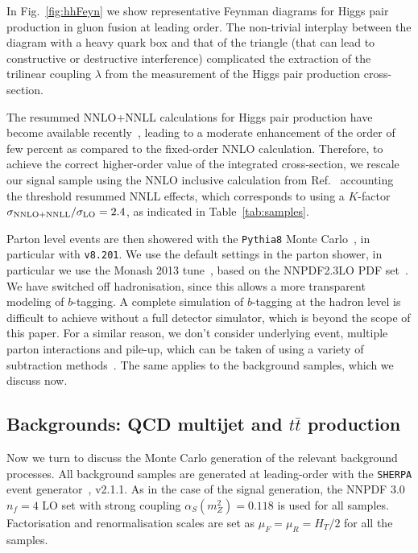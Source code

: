 In Fig.~\ref{fig:hhFeyn} we show representative Feynman diagrams
    for Higgs pair production in gluon fusion at
    leading order.
    The non-trivial interplay between the diagram with a heavy quark box
    and that of the triangle (that can lead to constructive or destructive interference)
    complicated the extraction of
    the trilinear coupling
    $\lambda$ from the measurement of the Higgs pair
    production cross-section.

The resummed NNLO+NNLL calculations for Higgs pair production have become available recently~\cite{deFlorian:2015moa},
leading to a moderate enhancement of the order of
few percent as compared to the fixed-order NNLO calculation.
%
Therefore, to achieve the correct higher-order value of the  integrated cross-section,
we rescale our signal sample using the
NNLO inclusive calculation from Ref.~\cite{deFlorian:2013jea} accounting the threshold resummed
NNLL effects, which corresponds to using a $K$-factor $\sigma_{\rm NNLO+NNLL}/\sigma_{\rm LO}=2.4$, as indicated
in Table~\ref{tab:samples}.


%
Parton level events are then showered with the {\tt Pythia8} Monte
Carlo~\cite{Sjostrand:2007gs,Sjostrand:2014zea}, in particular with {\tt v8.201}.
%
We use the default settings in the parton shower, in particular
we use the Monash 2013 tune~\cite{Skands:2014pea}, based on the NNPDF2.3LO PDF set~\cite{Ball:2012cx}.
%
We have switched off hadronisation, since this allows a more transparent modeling of
$b$-tagging.
%
A complete simulation of $b$-tagging at the hadron level is difficult to achieve without a full
detector simulator, which is beyond the scope of this paper.
%
For a similar reason, we don't consider underlying event, multiple parton interactions and
pile-up, which can be taken of using a variety of subtraction methods~\cite{Cacciari:2009dp,TheATLAScollaboration:2013pia}.
%
The same applies to the background samples, which we discuss now.

\subsection{Backgrounds: QCD multijet and $t\bar{t}$ production}

Now we turn to discuss the Monte Carlo generation of the relevant background processes.
%
All background samples are generated at leading-order
with the {\tt SHERPA} event generator~\cite{Gleisberg:2008ta}, v2.1.1.
%
As in the case of the signal generation, the NNPDF 3.0 $n_f = 4$ LO set with strong coupling
$\alpha_S(m_Z^2)=0.118$ is used for all samples.
%
Factorisation and renormalisation scales are set as $\mu_F=\mu_R=H_T/2$ for all
the samples.

